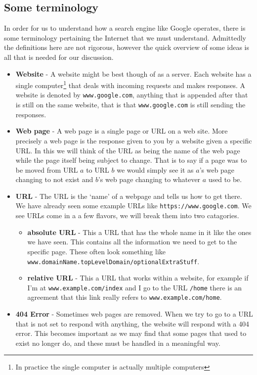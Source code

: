 \documentclass{article}
\begin{document}
	\subsection{Some terminology}
	In order for us to understand how a search engine like Google operates, there is some terminology pertaining the Internet that we must understand. Admittedly the definitions here are not rigorous, however the quick overview of some ideas is all that is needed for our discussion.
	\begin{itemize}
		
		\item \textbf{Website} - A website might be best though of as a server. Each website has a single computer\footnote{In practice the single computer is actually multiple computers} that deals with incoming requests and makes responses. A website is denoted by \verb|www.google.com|, anything that is appended after that is still on the same website, that is that \verb|www.google.com| is still sending the responses. 
		
		\item \textbf{Web page} - A web page is a single page or URL on a web site. More precisely a web page is the response given to you by a website given a specific URL. In this we will think of the URL as being the name of the web page while the page itself being subject to change. That is to say if a page was to be moved from  URL $a$ to URL $b$ we would simply see it as $a$'s web page changing to not exist and $b$'s web page changing to whatever $a$ used to be.
		
		\item \textbf{URL} - The URL is the `name' of a webpage and tells us how to get there. We have already seen some example URLs like \verb|https://www.google.com|. We see URLs come in a a few flavors, we will break them into two catagories.
		\begin{itemize}
			\item \textbf{absolute URL} - This a URL that has the whole name in it like the ones we have seen. This contains all the information we need to get to the specific page. These often look something like \verb|www.domainName.topLevelDomain/optionalExtraStuff|.
			\item \textbf{relative URL} - This a URL that works within a website, for example if I'm at \verb|www.example.com/index| and I go to the URL \verb|/home| there is an agreement that this link really refers to \verb|www.example.com/home|.
		\end{itemize}
		
		\item \textbf{404 Error} - Sometimes web pages are removed. When we try to go to a URL that is not set to respond with anything, the website will respond with a 404 error. This becomes important as we may find that some pages that used to exist no longer do, and these must be handled in a meaningful way.
		
		
	\end{itemize}
	
\end{document}
